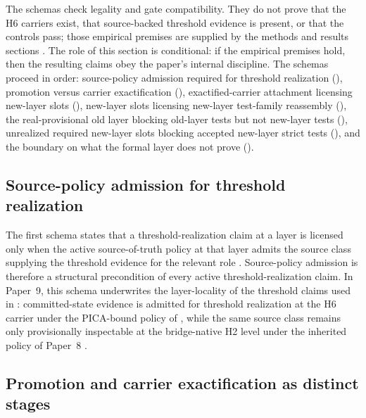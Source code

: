 \documentclass[11pt]{article}
\newcommand{\OldLayer}{H2}
\newcommand{\NewLayer}{H6}
\newcommand{\PaperNine}{Paper~9}
\newcommand{\PaperEight}{Paper~8}
\theoremstyle{definition}
\begin{document}
The schemas check legality and gate compatibility.  They do not prove that the
\NewLayer{} carriers exist, that source-backed threshold evidence is present,
or that the controls pass; those empirical premises are supplied by the methods
and results sections .
The role of this section is conditional: if the empirical premises hold, then
the resulting claims obey the paper's internal discipline.  The schemas proceed
in order: source-policy admission required for threshold realization
(), promotion versus carrier
exactification (),
exactified-carrier attachment licensing new-layer slots
(), new-layer slots licensing
new-layer test-family reassembly (),
the real-provisional old layer blocking old-layer tests but not new-layer tests
(), unrealized required new-layer slots
blocking accepted new-layer strict tests
(), and the boundary on what the
formal layer does not prove ().

\subsection{Source-policy admission for threshold realization}\label{subsec:schema-source-policy-threshold}

The first schema states that a threshold-realization claim at a layer is
licensed only when the active source-of-truth policy at that layer admits the
source class supplying the threshold evidence for the relevant role
\cite{Tsiokos2026FoundationsII}.  Source-policy admission is therefore a
structural precondition of every active threshold-realization claim.  In
\PaperNine{}, this schema underwrites the layer-locality of the threshold claims
used in : committed-state evidence is admitted for
threshold realization at the \NewLayer{} carrier under the PICA-bound policy of
, while the same source class remains
only provisionally inspectable at the bridge-native \OldLayer{} level under the
inherited policy of \PaperEight{} \cite{Tsiokos2026CarrierToEvent}.

\subsection{Promotion and carrier exactification as distinct stages}\label{subsec:schema-promotion-not-exactification}
\end{document}
